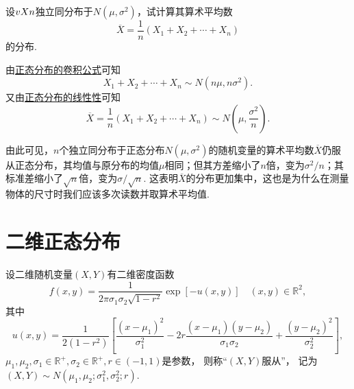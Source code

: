 \begin{example}
设\(v{X}{n}\)独立同分布于\(N(\mu,\sigma^2)\)，试计算其算术平均数\[
\overline{X} = \frac{1}{n} (X_1+X_2+\dotsb+X_n)
\]的分布.
\begin{solution}
由\hyperref[theorem:正态分布与自然指数分布族.正态分布的可加性2]{正态分布的卷积公式}可知\[
X_1+X_2+\dotsb+X_n \sim N(n\mu,n\sigma^2).
\]又由\hyperref[theorem:正态分布与自然指数分布族.正态分布的线性性质]{正态分布的线性性}可知\[
\overline{X} = \frac{1}{n} (X_1+X_2+\dotsb+X_n) \sim N\left(\mu,\frac{\sigma^2}{n}\right).
\]
\end{solution}
由此可见，\(n\)个独立同分布于正态分布\(N(\mu,\sigma^2)\)的随机变量的算术平均数\(\overline{X}\)仍服从正态分布，其均值与原分布的均值\(\mu\)相同；但其方差缩小了\(n\)倍，变为\(\sigma^2/n\)；其标准差缩小了\(\sqrt{n}\)倍，变为\(\sigma/\sqrt{n}\).
这表明\(\overline{X}\)的分布更加集中，这也是为什么在测量物体的尺寸时我们应该多次读数并取算术平均值.
\end{example}

\section{二维正态分布}
\begin{definition}
设二维随机变量\((X,Y)\)有二维密度函数
\begin{equation}
f(x,y) = \frac{1}{2\pi\sigma_1\sigma_2\sqrt{1-r^2}} \exp[- u(x,y)]
\quad(x,y)\in\mathbb{R}^2,
\end{equation}
其中\[
u(x,y)
= \frac{1}{2(1-r^2)} \left[
		\frac{(x-\mu_1)^2}{\sigma_1^2}
		-2r\frac{(x-\mu_1)(y-\mu_2)}{\sigma_1\sigma_2}
		+\frac{(y-\mu_2)^2}{\sigma_2^2}
	\right],
\]\(\mu_1,\mu_2,\sigma_1\in\mathbb{R}^+,\sigma_2\in\mathbb{R}^+,r\in(-1,1)\)是参数，%
则称“\((X,Y)\)服从”，%
记为\((X,Y) \sim N(\mu_1,\mu_2;\sigma_1^2,\sigma_2^2;r)\).
\end{definition}

